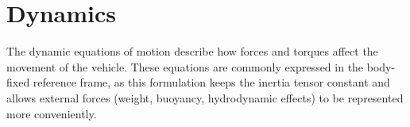 \begin{table}[H]
    \centering
    \caption{SNAME nomenclature and symbols \cite{abreuSensorbasedFormationControl2014}.}
    \label{tab:Sname_param}
\end{table}

\section{Dynamics}
The dynamic equations of motion describe how forces and torques affect the movement of the vehicle. These equations are commonly expressed in the body-fixed 
reference frame, as this formulation keeps the inertia tensor constant and allows external forces (weight, buoyancy, hydrodynamic effects) to be represented more conveniently.

